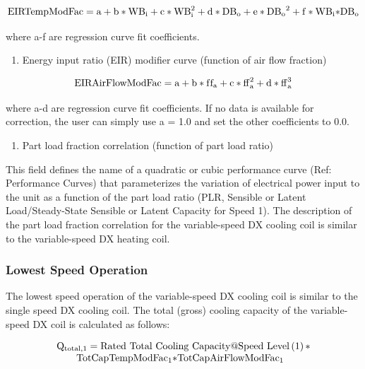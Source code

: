 \begin{equation}
{\rm{EIRTempModFac}} = {\rm{a}} + {\rm{b*W}}{{\rm{B}}_{\rm{i}}} + {\rm{c*WB}}_{\rm{i}}^2 + {\rm{d*D}}{{\rm{B}}_{\rm{o}}} + {\rm{e*D}}{{\rm{B}}_{\rm{o}}}^2 + {\rm{f*W}}{{\rm{B}}_{\rm{i}}}{\rm{*D}}{{\rm{B}}_{\rm{o}}}
\end{equation}

where a-f are regression curve fit coefficients.

\begin{enumerate}
\def\labelenumi{\arabic{enumi})}
\setcounter{enumi}{3}
\tightlist
\item
  Energy input ratio (EIR) modifier curve (function of air flow fraction)
\end{enumerate}

\begin{equation}
{\rm{EIRAirFlowModFac}} = {\rm{a}} + {\rm{b*f}}{{\rm{f}}_{\rm{a}}} + {\rm{c*ff}}_{\rm{a}}^2 + {\rm{d*ff}}_{\rm{a}}^3
\end{equation}

where a-d are regression curve fit coefficients.  If no data is available for correction, the user can simply use a = 1.0 and set the other coefficients to 0.0.

\begin{enumerate}
\def\labelenumi{\arabic{enumi})}
\setcounter{enumi}{4}
\tightlist
\item
  Part load fraction correlation (function of part load ratio)
\end{enumerate}

This field defines the name of a quadratic or cubic performance curve (Ref: Performance Curves) that parameterizes the variation of electrical power input to the unit as a function of the part load ratio (PLR, Sensible or Latent Load/Steady-State Sensible or Latent Capacity for Speed 1). The description of the part load fraction correlation for the variable-speed DX cooling coil is similar to the variable-speed DX heating coil.

\subsubsection{Lowest Speed Operation}\label{lowest-speed-operation}

The lowest speed operation of the variable-speed DX cooling coil is similar to the single speed DX cooling coil. The total (gross) cooling capacity of the variable-speed DX coil is calculated as follows:

\begin{equation}
  \begin{array}{l}
    \rm{Q}_{\rm{total},1} = \rm{Rated~Total~Cooling~Capacity} @ \rm{Speed~Level} \left( 1 \right) \rm{*} \\
    \quad \quad \rm{TotCapTempModFa} \rm{c}_1 \rm{*TotCapAirFlowModFa} \rm{c}_1
  \end{array}
\end{equation}


